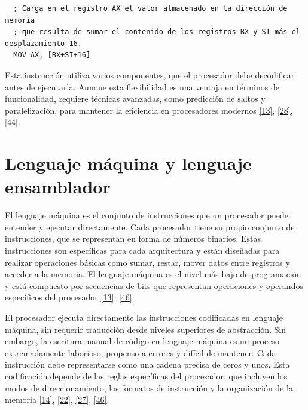 \documentclass[12pt,oneside]{templates/unerthesis}
\begin{document}
\begin{lstlisting}
  ; Carga en el registro AX el valor almacenado en la dirección de memoria
  ; que resulta de sumar el contenido de los registros BX y SI más el desplazamiento 16.
  MOV AX, [BX+SI+16]
  \end{lstlisting}

Esta instrucción utiliza varios componentes, que el procesador debe decodificar antes de ejecutarla. Aunque esta flexibilidad es una ventaja en términos de funcionalidad, requiere técnicas avanzadas, como predicción de saltos y paralelización, para mantener la eficiencia en procesadores modernos \protect\hyperlink{ref-hennessy2017computer}{{[}13{]}}, \protect\hyperlink{ref-patterson_computer_2014}{{[}28{]}}, \protect\hyperlink{ref-brey_intel_microprocessors}{{[}44{]}}.

\hypertarget{lenguaje-muxe1quina-y-lenguaje-ensamblador}{%
\section{Lenguaje máquina y lenguaje ensamblador}\label{lenguaje-muxe1quina-y-lenguaje-ensamblador}}

El lenguaje máquina es el conjunto de instrucciones que un procesador puede entender y ejecutar directamente. Cada procesador tiene su propio conjunto de instrucciones, que se representan en forma de números binarios. Estas instrucciones son específicas para cada arquitectura y están diseñadas para realizar operaciones básicas como sumar, restar, mover datos entre registros y acceder a la memoria. El lenguaje máquina es el nivel más bajo de programación y está compuesto por secuencias de bits que representan operaciones y operandos específicos del procesador
\protect\hyperlink{ref-hennessy2017computer}{{[}13{]}}, \protect\hyperlink{ref-irvine2011assembly}{{[}46{]}}.

El procesador ejecuta directamente las instrucciones codificadas en lenguaje máquina, sin requerir traducción desde niveles superiores de abstracción. Sin embargo, la escritura manual de código en lenguaje máquina es un proceso extremadamente laborioso, propenso a errores y difícil de mantener. Cada instrucción debe representarse como una cadena precisa de ceros y unos. Esta codificación depende de las reglas específicas del procesador, que incluyen los modos de direccionamiento, los formatos de instrucción y la organización de la memoria \protect\hyperlink{ref-stallings_computer_2021}{{[}14{]}}, \protect\hyperlink{ref-tanenbaum_structured_2016}{{[}22{]}}, \protect\hyperlink{ref-null_essentials_2023}{{[}27{]}}, \protect\hyperlink{ref-irvine2011assembly}{{[}46{]}}.
\end{document}
